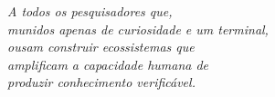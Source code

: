 \thispagestyle{empty}
\begin{flushright}
  \vspace*{8cm}
  \textit{A todos os pesquisadores que,\\
  munidos apenas de curiosidade e um terminal,\\
  ousam construir ecossistemas que\\
  amplificam a capacidade humana de\\
  produzir conhecimento verificável.}
\end{flushright}
\newpage
